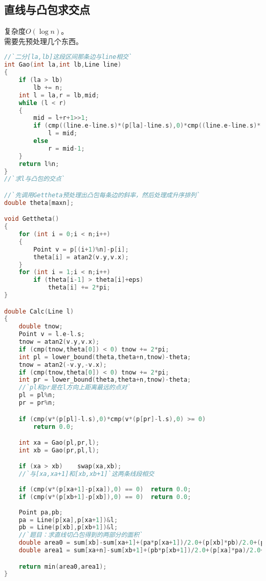\subsection{直线与凸包求交点}
	复杂度$O(\log{n})$。\\
	需要先预处理几个东西。\\
	\begin{lstlisting}[language=c++]
//`二分[la,lb]这段区间那条边与line相交`
int Gao(int la,int lb,Line line)
{
	if (la > lb)
		lb += n;
	int l = la,r = lb,mid;
	while (l < r)
	{
		mid = l+r+1>>1;
		if (cmp((line.e-line.s)*(p[la]-line.s),0)*cmp((line.e-line.s)*(p[mid]-line.s),0) >= 0)
			l = mid;
		else
			r = mid-1;
	}
	return l%n;
}
//`求l与凸包的交点`

//`先调用Gettheta预处理出凸包每条边的斜率，然后处理成升序排列`
double theta[maxn];

void Gettheta()
{
	for (int i = 0;i < n;i++)
	{
		Point v = p[(i+1)%n]-p[i];
		theta[i] = atan2(v.y,v.x);
	}
	for (int i = 1;i < n;i++)
		if (theta[i-1] > theta[i]+eps)
			theta[i] += 2*pi;
}

double Calc(Line l)
{
	double tnow;
	Point v = l.e-l.s;
	tnow = atan2(v.y,v.x);
	if (cmp(tnow,theta[0]) < 0)	tnow += 2*pi;
	int pl = lower_bound(theta,theta+n,tnow)-theta;
	tnow = atan2(-v.y,-v.x);
	if (cmp(tnow,theta[0]) < 0)	tnow += 2*pi;
	int pr = lower_bound(theta,theta+n,tnow)-theta;
	//`pl和pr是在l方向上距离最远的点对`
	pl = pl%n;
	pr = pr%n;

	if (cmp(v*(p[pl]-l.s),0)*cmp(v*(p[pr]-l.s),0) >= 0)
		return 0.0;

	int xa = Gao(pl,pr,l);
	int xb = Gao(pr,pl,l);

	if (xa > xb)	swap(xa,xb);
	//`与[xa,xa+1]和[xb,xb+1]`这两条线段相交
	
	if (cmp(v*(p[xa+1]-p[xa]),0) == 0)  return 0.0;
	if (cmp(v*(p[xb+1]-p[xb]),0) == 0)  return 0.0;
	
	Point pa,pb;
	pa = Line(p[xa],p[xa+1])&l;
	pb = Line(p[xb],p[xb+1])&l;
	//`题目：求直线切凸包得到的两部分的面积`
	double area0 = sum[xb]-sum[xa+1]+(pa*p[xa+1])/2.0+(p[xb]*pb)/2.0+(pb*pa)/2.0;
	double area1 = sum[xa+n]-sum[xb+1]+(pb*p[xb+1])/2.0+(p[xa]*pa)/2.0+(pa*pb)/2.0;

	return min(area0,area1);
}
	\end{lstlisting}